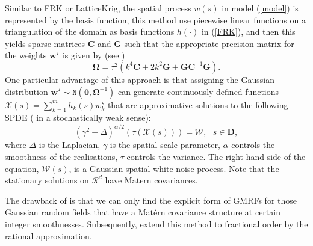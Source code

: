 \documentclass[
12pt, %
a4paper, %
oneside, %
headinclude,footinclude, %
BCOR5mm, %
]{scrartcl}
\begin{document}
Similar to FRK or LatticeKrig, the spatial process $w(s)$ in model (\ref{model}) is represented by the basis function,  this method
use piecewise linear functions on a triangulation of the domain as basis functions $h(\cdot)$ in (\ref{FRK}), and then this yields sparse matrices $\boldsymbol{C}$ and $\boldsymbol{G}$ such that the appropriate precision matrix for the weights $\boldsymbol{w}^{\star}$ is given by (see \href{https://chenyw68.github.io/Literature/[2015]Spatial and Spatio temporal Bayesian Models with R INLA.pdf}{\citep{blangiardo2015spatial}})
\begin{equation*}
\boldsymbol{\Omega} = \tau^2(k^4\boldsymbol{C} + 2k^2\boldsymbol{G} + \boldsymbol{G}\boldsymbol{C}^{-1}\boldsymbol{G}).
\end{equation*}
One particular advantage of this approach is that
assigning the Gaussian distribution $\boldsymbol{w}^{\star} \sim \texttt{N}(\boldsymbol{0}, \boldsymbol{\Omega}^{-1})$ can generate continuously defined functions $\mathcal{X}(s) = \sum_{k = 1}^{m}h_k(s)w_k^{\star} $ that are approximative solutions to the following SPDE ( in a stochastically weak sense):
\begin{equation*}
  (\gamma^2 - \Delta)^{\alpha/2}\left(\tau(\mathcal{X}(s))\right) = \mathcal{W}, ~~~ s \in \boldsymbol{D},
\end{equation*}
where $\Delta$ is the Laplacian, $\gamma$ is the spatial scale parameter, $\alpha$ controls the smoothness of the
realisations, $\tau$ controls the variance. The right-hand side of the equation, $\mathcal{W}(s)$, is a Gaussian spatial white noise process. \textcolor[rgb]{0.50,0.50,0.50}{Note that the stationary solutions on $\mathcal{R}^d$ have Matern covariances}.

The drawback of \href{https://chenyw68.github.io/Literature/[2011]An explicit link between GF and GMRFs the SPDE approach.pdf}{\citet{lindgren2011explicit}} is that we can only find the explicit form of GMRFs for those Gaussian random fields that have a Matérn covariance structure at certain integer smoothnesses. Subsequently, \href{https://chenyw68.github.io/Literature/https://chenyw68.github.io/Literature/[2020]The Rational SPDE Approach for Gaussian Random Fields With General Smoothness.pdf}{\cite{bolin2020rational}} extend this method to fractional order by the rational approximation.
\end{document}
